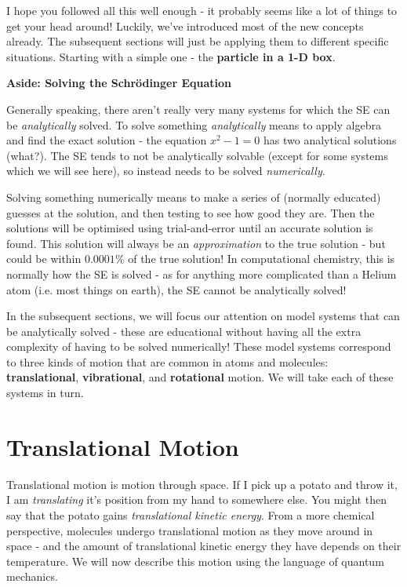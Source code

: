 \documentclass{memoir}[11pt,oneside,a4paper,openany]
\begin{document}
I hope you followed all this well enough - it probably seems like a lot of things to get your head around! Luckily, we've introduced most of the new concepts already. The subsequent sections will just be applying them to different specific situations. Starting with a simple one - the \textbf{particle in a 1-D box}.
\newpage
\begin{vplace}
	\begin{center}\textbf{\Large{Aside: Solving the Schr{\"o}dinger Equation}}\end{center}
Generally speaking, there aren't really very many systems for which the SE can be \emph{analytically} solved. To solve something \emph{analytically} means to apply algebra and find the exact solution - the equation $x^2 - 1 = 0$ has two analytical solutions (what?). The SE tends to not be analytically solvable (except for some systems which we will see here), so instead needs to be solved \emph{numerically}. 

	Solving something numerically means to make a series of (normally educated) guesses at the solution, and then testing to see how good they are. Then the solutions will be optimised using trial-and-error until an accurate solution is found. This solution will always be an \emph{approximation} to the true solution - but could be within $0.0001\%$ of the true solution! In computational chemistry, this is normally how the SE is solved - as for anything more complicated than a Helium atom (i.e. most things on earth), the SE cannot be analytically solved! 

In the subsequent sections, we will focus our attention on model systems that can be analytically solved - these are educational without having all the extra complexity of having to be solved numerically! These model systems correspond to three kinds of motion that are common in atoms and molecules: \textbf{translational}, \textbf{vibrational}, and \textbf{rotational} motion. We will take each of these systems in turn.  
\end{vplace}
\chapter{Translational Motion}
Translational motion is motion through space. If I pick up a potato and throw it, I am \emph{translating} it's position from my hand to somewhere else. You might then say that the potato gains \emph{translational kinetic energy}. From a more chemical perspective, molecules undergo translational motion as they move around in space - and the amount of translational kinetic energy they have depends on their temperature. We will now describe this motion using the language of quantum mechanics.
\end{document}
